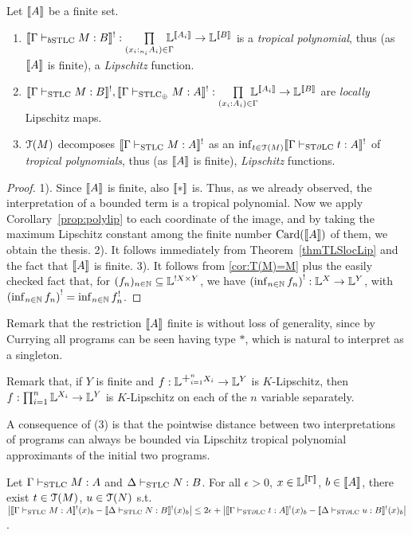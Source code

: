 \begin{corollary}
Let $\llbracket A\rrbracket$ be a finite set.
\begin{enumerate}
\item $\model{\Gamma \vdash_{\BSTLC} M:B}^!:\prod\limits_{(x_i:_{n_i} A_i)\in\Gamma} \!\!\!\!\!\Lawv^{\model{A_i}} \to \Lawv^{\model B}$ is a \emph{tropical polynomial}, thus (as $\llbracket A\rrbracket$ is finite), a \emph{Lipschitz} function.
\item $\llbracket\Gamma \vdash_{\mathrm{STLC}} M:B\rrbracket^!, \llbracket\Gamma \vdash_{\mathrm{STLC}_\oplus} M:A\rrbracket^!:\prod\limits_{(x_i: A_i)\in\Gamma} \!\!\!\!\!\mathbb{L}^{\llbracket A_i\rrbracket} \to \mathbb{L}^{\llbracket B\rrbracket}$ are \emph{locally} Lipschitz maps.
\item $\mathcal{T}(M)$ decomposes $\llbracket\Gamma \vdash_{\mathrm{STLC}} M:A\rrbracket^!$ as an $\inf_{t\in\mathcal{T}(M)}\llbracket\Gamma\vdash_{\mathrm{ST}\partial\mathrm{LC}} t:A\rrbracket^!$ of \emph{tropical polynomials}, thus (as $\llbracket A\rrbracket$ is finite), \emph{Lipschitz} functions.
\end{enumerate}
\end{corollary} 
\begin{proof}
1). Since $\llbracket A\rrbracket$ is finite, also $\llbracket*\rrbracket$ is.
Thus, as we already observed, the interpretation of a bounded term is a tropical polynomial.
Now we apply Corollary~\ref{prop:polylip} to each coordinate of the image, and by taking the maximum Lipschitz constant among the finite number $\mathrm{Card}(\llbracket A\rrbracket)$ of them, we obtain the thesis.
2). It follows immediately from Theorem~\ref{thmTLSlocLip} and the fact that $\llbracket A\rrbracket$ is finite.
3). It follows from \autoref{cor:T(M)=M} plus the easily checked fact that, for $(f_n)_{n\in\mathbb{N}}\subseteq\mathbb{L}^{!X\times Y}$, we have $\left(\inf_{n\in\mathbb{N}} f_n\right)^!:\mathbb{L}^X\to\mathbb{L}^Y$, with $\left(\inf_{n\in\mathbb{N}} f_n\right)^!=\inf_{n\in\mathbb{N}} f_n^!$.
\end{proof}

Remark that the restriction $\llbracket A\rrbracket$ finite is without loss of generality, since by Currying all programs can be seen having type $*$, which is natural to interpret as a singleton.

Remark that, if $Y$ is finite and $f:\Lawv^{\mathlarger{+}_{i=1}^n X_i}\to\Lawv^Y$ is $K$-Lipschitz, then $f:\prod_{i=1}^n \mathbb{L}^{X_i}\to \mathbb{L}^Y$ is $K$-Lipschitz on each of the $n$ variable separately.

A consequence of (3) is that the pointwise distance between two interpretations of programs can always be bounded via Lipschitz tropical polynomial approximants of the initial two programs.
\begin{corollary}
 Let $\Gamma \vdash_{\mathrm{STLC}} M:A$ and $\Delta\vdash_{\mathrm{STLC}} N:B$.
 For all $\epsilon>0$, $x\in\mathbb{L}^{\llbracket\Gamma\rrbracket}$, $b\in\llbracket A\rrbracket$, there exist $t\in\mathcal{T}(M)$, $u\in\mathcal{T}(N)$ s.t.\ $\big| \llbracket\Gamma \vdash_{\mathrm{STLC}} M:A\rrbracket^!(x)_b - \llbracket\Delta \vdash_{\mathrm{STLC}} N:B\rrbracket^!(x)_b \big| \leq 2\epsilon + \big| \llbracket\Gamma \vdash_{\mathrm{ST}\partial\mathrm{LC}} t:A\rrbracket^!(x)_b - \llbracket\Delta \vdash_{\mathrm{ST}\partial\mathrm{LC}} u:B\rrbracket^!(x)_b \big|$.
\end{corollary}
